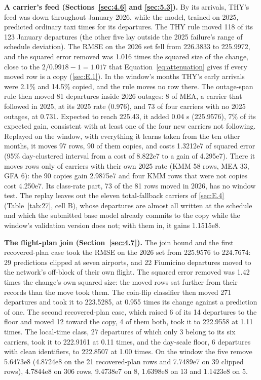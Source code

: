 \documentclass[
  manuscript=article,
  layout=preprint,
  year=2026,
  volume=x,
]{extra/joas}
\begin{document}
\textbf{A carrier's feed (Sections~\ref{sec:4.6} and \ref{sec:5.3}).} By its arrivals, THY's feed was down throughout January 2026, while the model, trained on 2025, predicted ordinary taxi times for its departures. The THY rule moved 118 of its 123 January departures (the other five lay outside the 2025 failure's range of schedule deviation). The RMSE on the 2026 set fell from 226.3833 to 225.9972, and the squared error removed was 1.016 times the squared size of the change, close to the $2/0.9918 - 1 = 1.017$ that Equation~\ref{eq:attenuation} gives if every moved row is a copy (\ref{sec:E.1}). In the window's months THY's early arrivals were 2.1\% and 14.5\% copied, and the rule moves no row there. The outage-span rule then moved 81 departures inside 2026 outages: 8 of MEA, a carrier that followed in 2025, at its 2025 rate (0.976), and 73 of four carriers with no 2025 outages, at 0.731. Expected to reach 225.43, it added 0.04 s (225.9576), 7\% of its expected gain, consistent with at least one of the four new carriers not following. Replayed on the window, with everything it learns taken from the ten other months, it moves 97 rows, 90 of them copies, and costs 1.3212e7 of squared error (95\% day-clustered interval from a cost of 8.822e7 to a gain of 4.295e7). There it moves rows only of carriers with their own 2025 rate (KMM 58 rows, MEA 33, GFA 6): the 90 copies gain 2.9875e7 and four KMM rows that were not copies cost 4.250e7. Its class-rate part, 73 of the 81 rows moved in 2026, has no window test. The replay leaves out the eleven total-fallback carriers of \ref{sec:E.4} (Table~\ref{tab:27}, cell B), whose departures are almost all written at the schedule and which the submitted base model already commits to the copy while the window's validation version does not; with them in, it gains 1.1515e8.

\textbf{The flight-plan join (Section~\ref{sec:4.7}).} The join bound and the first recovered-plan case took the RMSE on the 2026 set from 225.9576 to 224.7674: 29 predictions clipped at seven airports, and 22 Fiumicino departures moved to the network's off-block of their own flight. The squared error removed was 1.42 times the change's own squared size: the moved rows sat further from their records than the move took them. The coin-flip classifier then moved 271 departures and took it to 223.5285, at 0.955 times its change against a prediction of one. The second recovered-plan case, which raised 6 of its 14 departures to the floor and moved 12 toward the copy, 4 of them both, took it to 222.9558 at 1.11 times. The local-time class, 27 departures of which only 3 belong to its six carriers, took it to 222.9161 at 0.11 times, and the day-scale floor, 6 departures with clean identifiers, to 222.8507 at 1.00 times. On the window the five remove 5.6473e8 (4.8724e8 on the 21 recovered-plan rows and 7.7489e7 on 39 clipped rows), 4.7844e8 on 306 rows, 9.4738e7 on 8, 1.6398e8 on 13 and 1.1423e8 on 5.
\end{document}
